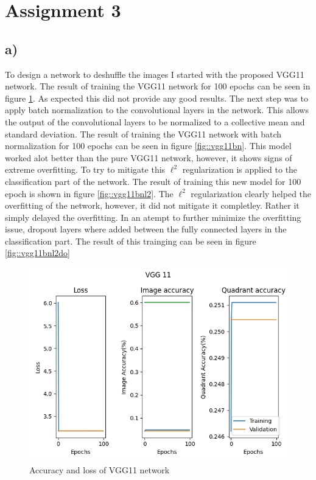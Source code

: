 \documentclass{article}
\begin{document}
\section{Assignment 3}
\subsection*{a)}
To design a network to deshuffle the images I started with the proposed VGG11 network. The result of training the VGG11 network for 100 epochs can be seen in figure \ref{fig::vgg11}. As expected this did not provide any good results. The next step was to apply batch normalization to the convolutional layers in the network. This allows the output of the convolutional layers to be normalized to a collective mean and standard deviation\cite{batchnorm}. The result of training the VGG11 network with batch normalization for 100 epochs can be seen in figure \ref{fig::vgg11bn}. This model worked alot better than the pure VGG11 network, however, it shows signs of extreme overfitting. To try to mitigate this $\ell^2$ regularization is applied to the classification part of the network. The result of training this new model for 100 epoch is shown in figure \ref{fig::vgg11bnl2}. The $\ell^2$ regularization clearly helped the overfitting of the network, however, it did not mitigate it completley. Rather it simply delayed the overfitting. In an atempt to further minimize the overfitting issue, dropout layers where added between the fully connected layers in the classification part. The result of this trainging can be seen in figure \ref{fig::vgg11bnl2do}
\begin{figure}[h]
    \begin{center}
        \includegraphics{../Task3/Figures/VGG11.png}
        \caption{Accuracy and loss of VGG11 network}
        \label{fig::vgg11}
    \end{center}
\end{figure}
\end{document}
